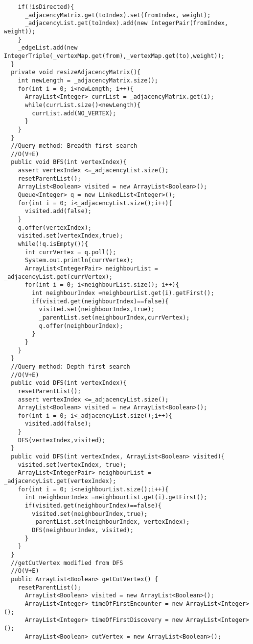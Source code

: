 \documentclass[11pt]{article}
\theoremstyle{definition}
\begin{document}
\begin{verbatim}
    if(!isDirected){
      _adjacencyMatrix.get(toIndex).set(fromIndex, weight);
      _adjacencyList.get(toIndex).add(new IntegerPair(fromIndex, weight));
    }
    _edgeList.add(new IntegerTriple(_vertexMap.get(from),_vertexMap.get(to),weight));
  }
  private void resizeAdjacencyMatrix(){
    int newLength = _adjacencyMatrix.size();
    for(int i = 0; i<newLength; i++){
      ArrayList<Integer> currList = _adjacencyMatrix.get(i);
      while(currList.size()<newLength){
        currList.add(NO_VERTEX);
      }
    }
  }
  //Query method: Breadth first search
  //O(V+E)
  public void BFS(int vertexIndex){
    assert vertexIndex <=_adjacencyList.size();
    resetParentList();
    ArrayList<Boolean> visited = new ArrayList<Boolean>();
    Queue<Integer> q = new LinkedList<Integer>();
    for(int i = 0; i<_adjacencyList.size();i++){
      visited.add(false);
    }
    q.offer(vertexIndex);
    visited.set(vertexIndex,true);
    while(!q.isEmpty()){
      int currVertex = q.poll();
      System.out.println(currVertex);
      ArrayList<IntegerPair> neighbourList =  _adjacencyList.get(currVertex);
      for(int i = 0; i<neighbourList.size(); i++){
        int neighbourIndex =neighbourList.get(i).getFirst();
        if(visited.get(neighbourIndex)==false){
          visited.set(neighbourIndex,true);
          _parentList.set(neighbourIndex,currVertex);
          q.offer(neighbourIndex);
        }
      }
    }
  }
  //Query method: Depth first search
  //O(V+E)
  public void DFS(int vertexIndex){
    resetParentList();
    assert vertexIndex <=_adjacencyList.size();
    ArrayList<Boolean> visited = new ArrayList<Boolean>();
    for(int i = 0; i<_adjacencyList.size();i++){
      visited.add(false);
    }
    DFS(vertexIndex,visited);
  }
  public void DFS(int vertexIndex, ArrayList<Boolean> visited){
    visited.set(vertexIndex, true);
    ArrayList<IntegerPair> neighbourList =  _adjacencyList.get(vertexIndex);
    for(int i = 0; i<neighbourList.size();i++){
      int neighbourIndex =neighbourList.get(i).getFirst();
      if(visited.get(neighbourIndex)==false){
        visited.set(neighbourIndex,true);
        _parentList.set(neighbourIndex, vertexIndex);
        DFS(neighbourIndex, visited);
      }
    }
  }
  //getCutVertex modified from DFS
  //O(V+E)
  public ArrayList<Boolean> getCutVertex() {
    resetParentList();
      ArrayList<Boolean> visited = new ArrayList<Boolean>();
      ArrayList<Integer> timeOfFirstEncounter = new ArrayList<Integer>();
      ArrayList<Integer> timeOfFirstDiscovery = new ArrayList<Integer>();
      ArrayList<Boolean> cutVertex = new ArrayList<Boolean>();

\end{verbatim}
\end{document}
